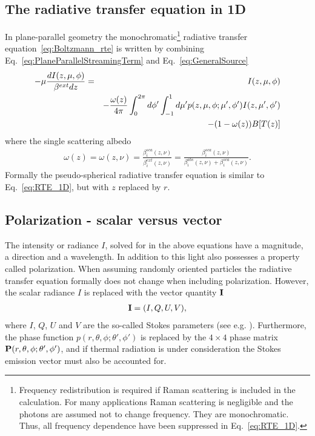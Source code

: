 \subsection{The radiative transfer equation in 1D}
In plane-parallel geometry the monochromatic\footnote{Frequency
  redistribution is required if Raman scattering is included in the
  calculation. For many applications Raman scattering is negligible
  and the photons are assumed not to change frequency. They are
  monochromatic. Thus, all frequency dependence have been suppressed
  in Eq.~\ref{eq:RTE_1D}.}
radiative transfer
equation~\ref{eq:Boltzmann_rte} is written by combining
Eq.~\ref{eq:PlaneParallelStreamingTerm} and
Eq.~\ref{eq:GeneralSource}
\begin{eqnarray}
 - \mu {dI(z,\mu,\phi) \over \beta^{ext}dz}&=& I(z,\mu,\phi) \nonumber\\
 && - {\omega(z) \over 4\pi } \int^{2\pi}_{0}d\phi' \int^{1}_{-1}d\mu'
   p(z,\mu,\phi;\mu',\phi')I(z,\mu',\phi') \nonumber\\
& &-(1-\omega(z))B[T(z)]
  \label{eq:RTE_1D}
\end{eqnarray}
where the single scattering albedo 
\begin{eqnarray}
\omega(z)=\omega(z,\nu)=
\frac{\beta_{i}^{sca}(z, \nu)}{\beta_{i}^{ext}(z, \nu)}=
\frac{\beta_{i}^{sca}(z, \nu)}{\beta_{i}^{abs}(z, \nu)+\beta_{i}^{sca}(z, \nu)}.
\nonumber
\end{eqnarray}
Formally the pseudo-spherical radiative transfer equation is similar
to Eq.~\ref{eq:RTE_1D}, but with $z$ replaced by $r$.



\subsection{Polarization - scalar versus vector}
The intensity or radiance $I$, solved for in the above equations have
a magnitude, a direction and a wavelength. In addition to this light
also possesses a property called polarization. When assuming randomly
oriented particles the radiative transfer equation formally does not
change when including polarization. However, the scalar radiance $I$
is replaced with the vector quantity ${\bf I}$
\begin{eqnarray}
{\bf I} = (I, Q, U, V),
\end{eqnarray}
where $I$, $Q$, $U$ and $V$ are the so-called Stokes parameters (see
e.g. \citet{bohren1998}). Furthermore, the phase function $p(r,\theta,
\phi; \theta', \phi')$ is replaced by the $4\times 4$ phase matrix ${\bf
  P}(r,\theta, \phi; \theta', \phi')$, and if thermal radiation is under
consideration the Stokes emission vector must also be accounted for.

